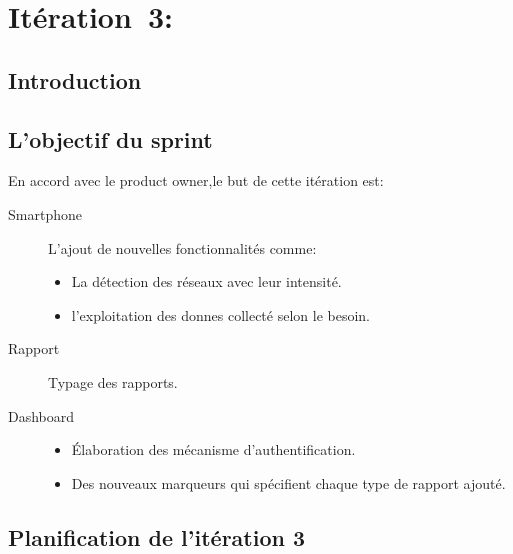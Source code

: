 \section[Itération~3:~(~4/3/2017~-~4/28/2017~)]{Itération~3:~\textup{}}

\subsection{Introduction}

\subsection{L'objectif du sprint}

En accord avec le product owner,le but de cette itération est:

\begin{description}
    \item [Smartphone] L’ajout de nouvelles fonctionnalités comme:
        \begin{itemize}
            \item La détection des réseaux avec leur intensité.
            \item l'exploitation des donnes collecté selon le besoin.
        \end{itemize}
    \item [Rapport] Typage des rapports.
    \item [Dashboard]
        \begin{itemize}
            \item Élaboration des mécanisme d'authentification.
            \item Des nouveaux marqueurs qui spécifient chaque type de rapport
                ajouté.
        \end{itemize}
\end{description}


\subsection{Planification de l'itération 3}

